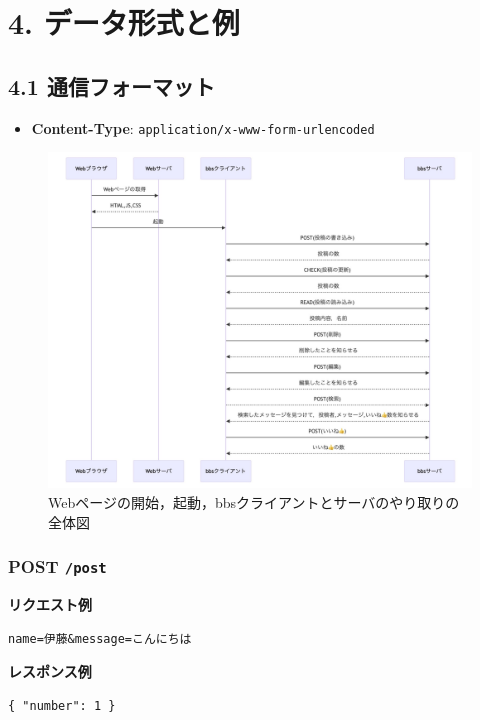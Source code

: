 \documentclass[uplatex,dvipdfmx]{jsarticle}
\begin{document}
\section*{4. データ形式と例}
\subsection*{4.1 通信フォーマット}
\begin{itemize}
\item \textbf{Content-Type}: \texttt{application/x-www-form-urlencoded}
\end{itemize}

\begin{figure}[H]
\centering
 \centering
\includegraphics[width=15cm]{rrr.jpg}
\caption{Webページの開始，起動，bbsクライアントとサーバのやり取りの全体図}
\label{fig:b02}
\end{figure}

\subsubsection*{POST \texttt{/post}}
\textbf{リクエスト例}
\begin{verbatim}
name=伊藤&message=こんにちは
\end{verbatim}
\textbf{レスポンス例}
\begin{verbatim}
{ "number": 1 }
\end{verbatim}
\end{document}
